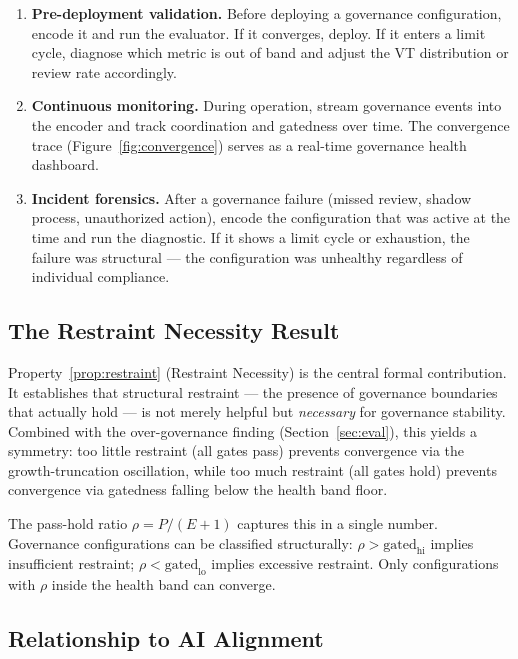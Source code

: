 \documentclass[sigconf,nonacm]{acmart}
\begin{document}
\begin{enumerate}[leftmargin=*]
  \item \textbf{Pre-deployment validation.} Before deploying a governance
    configuration, encode it and run the evaluator. If it converges, deploy.
    If it enters a limit cycle, diagnose which metric is out of band and
    adjust the VT distribution or review rate accordingly.

  \item \textbf{Continuous monitoring.} During operation, stream governance
    events into the encoder and track coordination and gatedness over time.
    The convergence trace (Figure~\ref{fig:convergence}) serves as a
    real-time governance health dashboard.

  \item \textbf{Incident forensics.} After a governance failure (missed
    review, shadow process, unauthorized action), encode the configuration
    that was active at the time and run the diagnostic. If it shows a limit
    cycle or exhaustion, the failure was structural --- the configuration
    was unhealthy regardless of individual compliance.
\end{enumerate}

\subsection{The Restraint Necessity Result}

Property~\ref{prop:restraint} (Restraint Necessity) is the central
formal contribution. It establishes that structural restraint --- the
presence of governance boundaries that actually hold --- is not merely
helpful but \emph{necessary} for governance stability. Combined with the
over-governance finding (Section~\ref{sec:eval}), this yields a
symmetry: too little restraint (all gates pass) prevents convergence
via the growth-truncation oscillation, while too much restraint (all
gates hold) prevents convergence via gatedness falling below the health
band floor.

The pass-hold ratio $\rho = P/(E+1)$ captures this in a single number.
Governance configurations can be classified structurally:
$\rho > \mathrm{gated}_{\mathrm{hi}}$ implies insufficient restraint;
$\rho < \mathrm{gated}_{\mathrm{lo}}$ implies excessive restraint.
Only configurations with $\rho$ inside the health band can converge.

\subsection{Relationship to AI Alignment}
\end{document}
